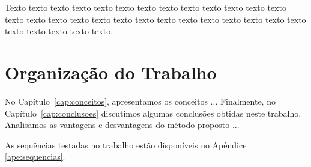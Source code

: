 Texto texto texto texto texto texto texto texto texto texto texto texto texto
texto texto texto texto texto texto texto texto texto texto texto texto texto
texto texto texto texto texto texto.


\section{Organização do Trabalho}
\label{sec:organizacao_trabalho}

No Capítulo~\ref{cap:conceitos}, apresentamos os conceitos ... Finalmente, no
Capítulo~\ref{cap:conclusoes} discutimos algumas conclusões obtidas neste
trabalho. Analisamos as vantagens e desvantagens do método proposto ... 

As sequências testadas no trabalho estão disponíveis no Apêndice \ref{ape:sequencias}.
